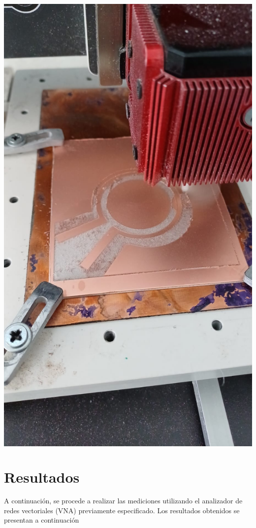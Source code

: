 \documentclass[a4paper, 12pt]{article}
\begin{document}
\begin{minipage}{0.33\linewidth}
\includegraphics[width=0.99\linewidth]{./img/construccion2.jpg}
\end{minipage}

\section{Resultados}
A continuación, se procede a realizar las mediciones utilizando el analizador de redes vectoriales (VNA) previamente especificado. Los resultados obtenidos se presentan a continuación
\end{document}
